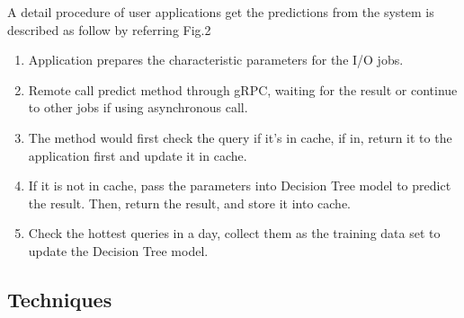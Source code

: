 \documentclass[conference]{IEEEtran}
\begin{document}
A detail procedure of user applications get the predictions from the system is described as follow by referring Fig.2
\begin{enumerate}
	\item Application prepares the characteristic parameters for the I/O jobs.
	\item Remote call predict method through gRPC, waiting for the result or continue to other jobs if using asynchronous call.
	\item The method would first check the query if it's in cache, if in, return it to the application first and update it in cache.
	\item If it is not in cache, pass the parameters into Decision Tree model to predict the result. Then, return the result, and store it into cache.
	\item Check the hottest queries in a day, collect them as the training data set to update the Decision Tree model.
\end{enumerate}


\subsection{Techniques}
\end{document}
